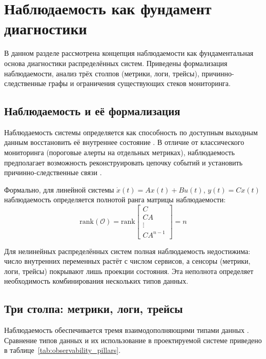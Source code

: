 \chapter{Наблюдаемость как фундамент диагностики}\label{ch:observability}

В данном разделе рассмотрена концепция наблюдаемости как фундаментальная основа диагностики распределённых систем. Приведены формализация наблюдаемости, анализ трёх столпов (метрики, логи, трейсы), причинно-следственные графы и ограничения существующих стеков мониторинга.

\section{Наблюдаемость и её формализация}

Наблюдаемость системы определяется как способность по доступным выходным данным восстановить её внутреннее состояние \cite{charity_majors_observability,observability_three_pillars,russian_observability}. В отличие от классического мониторинга (пороговые алерты на отдельных метриках), наблюдаемость предполагает возможность реконструировать цепочку событий и установить причинно-следственные связи \cite{observability_three_pillars,ieee_observability}.

Формально, для линейной системы $\dot{x}(t) = Ax(t) + Bu(t)$, $y(t) = Cx(t)$ наблюдаемость определяется полнотой ранга матрицы наблюдаемости:
\begin{equation}
\text{rank}(\mathcal{O}) = \text{rank}\begin{bmatrix} C \\ CA \\ \vdots \\ CA^{n-1} \end{bmatrix} = n
\label{eq:observability_matrix}
\end{equation}

Для нелинейных распределённых систем полная наблюдаемость недостижима: число внутренних переменных растёт с числом сервисов, а сенсоры (метрики, логи, трейсы) покрывают лишь проекции состояния. Эта неполнота определяет необходимость комбинирования нескольких типов данных.

\section{Три столпа: метрики, логи, трейсы}

Наблюдаемость обеспечивается тремя взаимодополняющими типами данных \cite{observability_three_pillars,ieee_observability}. Сравнение типов данных и их использование в проектируемой системе приведено в таблице~\ref{tab:observability_pillars}.

